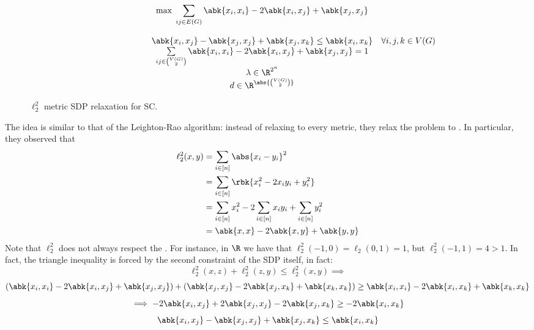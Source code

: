 \documentclass[a4paper, 12pt]{report}
\begin{document}
    \begin{figure}[H]
        \centering
        \[\begin{array}{ccl}
            \qquad\qquad\quad
            & \max \; \displaystyle \sum_{ij \in E(G)}{\abk{x_i,x_i} - 2 \abk{x_i,x_j} + \abk{x_j,x_j}} \\\\
            & \abk{x_i, x_j} - \abk{x_j, x_j} + \abk{x_j, x_k} \le \abk{x_i, x_k} & \forall i, j ,k \in V(G) \\
            & \sum\limits_{ij \in \binom{V(G)}{2}}{\abk{x_i,x_i} - 2 \abk{x_i,x_j} + \abk{x_j,x_j}} = 1 \\
            & \lambda \in \R^{2^n} \\
            & d \in \R^{\abs{\binom{V(G)}{2}}} \\
        \end{array}\]
        \caption{$\ell_2^2$ metric SDP relaxation for SC.}
    \end{figure}

    The idea is similar to that of the Leighton-Rao algorithm: instead of relaxing to every metric, they relax the problem to . In particular, they observed that
    \begin{equation*}
        \begin{split}
            \ell_2^2(x, y) &= \sum_{i \in [n]}{\abs{x_i - y_i}^2} \\
                           &= \sum_{i \in [n]}{\rbk{x_i^2 - 2x_iy_i + y_i^2}} \\
                           &= \sum_{i \in [n]}{x_i^2 - 2\sum_{i \in [n]}{x_iy_i} + \sum_{i \in [n]}{y_i^2}} \\
                           &= \abk{x,x} - 2 \abk{x,y} + \abk{y,y}
        \end{split}
    \end{equation*}
    Note that $\ell_2^2$ does not always respect the . For instance, in $\R$ we have that $\ell_2^2(-1, 0) = \ell_2(0, 1) = 1$, but $\ell_2^2(-1, 1) = 4 > 1$. In fact, the triangle inequality is forced by the second constraint of the SDP itself, in fact: $$\ell_2^2(x, z) + \ell_2^2(z, y) \le \ell_2^2(x, y) \implies$$ $$(\abk{x_i, x_i} - 2\abk{x_i, x_j} + \abk{x_j, x_j}) + (\abk{x_j, x_j} - 2\abk{x_j , x_k} + \abk{x_k, x_k}) \ge \abk{x_i, x_i} - 2 \abk{x_i, x_k} + \abk{x_k, x_k}$$ $$\implies -2 \abk{x_i, x_j} + 2\abk{x_j , x_j} - 2 \abk{x_j , x_k } \ge -2 \abk{x_i , x_k}$$ $$\abk{x_i, x_j} - \abk{x_j , x_j} + \abk{x_j , x_k} \le \abk{x_i, x_k}$$
\end{document}
